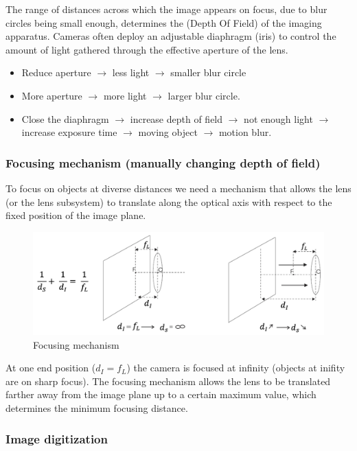\documentclass{article}
\begin{document}
The range of distances across which the image appears on focus, due to blur circles being small enough, determines the (Depth Of Field) of the imaging apparatus.
Cameras often deploy an adjustable diaphragm (iris) to control the amount of light gathered through the effective aperture of the lens.
\begin{itemize}
  \item Reduce aperture $\rightarrow$ less light $\rightarrow$ smaller blur circle
  \item More aperture $\rightarrow$ more light $\rightarrow$ larger blur circle.
  \item Close the diaphragm $\rightarrow$ increase depth of field $\rightarrow$ not enough light $\rightarrow$ increase exposure time $\rightarrow$ moving object $\rightarrow$ motion blur.
\end{itemize}

\subsubsection{Focusing mechanism (manually changing depth of field)}
To focus on objects at diverse distances we need a mechanism that allows the lens (or the lens subsystem) to translate along the optical axis with respect to the fixed position of the image plane.

\begin{figure}[htbp]
  \centering
  \includegraphics[width=0.7\linewidth]{./img/focusing_mechanism.jpg}
  \caption{Focusing mechanism}
  \label{fig:focusing_mechanism}
\end{figure}

At one end position ($d_I = f_L$) the camera is focused at infinity (objects at inifity are on sharp focus).
The focusing mechanism allows the lens to be translated farther away from the image plane up to a certain maximum value, which determines the minimum focusing distance.

\subsubsection{Image digitization}
\end{document}

